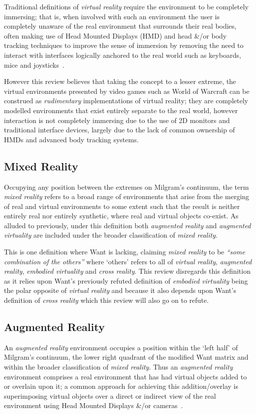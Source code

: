 Traditional definitions of \textit{virtual reality} require the environment to be completely immersing; that is, when involved with such an environment the user is completely unaware of the real environment that surrounds their real bodies, often making use of Head Mounted Displays (HMD) and head \&/or body tracking techniques to improve the sense of immersion by removing the need to interact with interfaces logically anchored to the real world such as keyboards, mice and joysticks~\cite{Druck2006}.

However this review believes that taking the concept to a lesser extreme, the virtual environments presented by video games such as World of Warcraft can be construed as \textit{rudimentary} implementations of virtual reality; they are completely modelled environments that exist entirely separate to the real world, however interaction is not completely immersing due to the use of 2D monitors and traditional interface devices, largely due to the lack of common ownership of HMDs and advanced body tracking systems.

\subsection{Mixed Reality}
Occupying any position between the extremes on Milgram's continuum, the term \textit{mixed reality} refers to a broad range of environments that arise from the merging of real and virtual environments to some extent such that the result is neither entirely real nor entirely synthetic, where real and virtual objects co-exist. As alluded to previously, under this definition both \textit{augmented reality} and \textit{augmented virtuality} are included under the broader classification of \textit{mixed reality}.

This is one definition where Want is lacking, claiming \textit{mixed reality} to be \textit{``some combination of the others''} where `others' refers to all of \textit{virtual reality}, \textit{augmented reality}, \textit{embodied virtuality} and \textit{cross reality}. This review disregards this definition as it relies upon Want's previously refuted definition of \textit{embodied virtuality} being the polar opposite of \textit{virtual reality} and because it also depends upon Want's definition of \textit{cross reality} which this review will also go on to refute.

\subsection{Augmented Reality}
An \textit{augmented reality} environment occupies a position within the `left half' of Milgram's continuum, the lower right quadrant of the modified Want matrix and within the broader classification of \textit{mixed reality}. Thus an \textit{augmented reality} environment comprises a real environment that has had virtual objects added to or overlain upon it; a common approach for achieving this addition/overlay is superimposing virtual objects over a direct or indirect view of the real environment using Head Mounted Displays \&/or cameras~\cite{Krevelen2010}.

